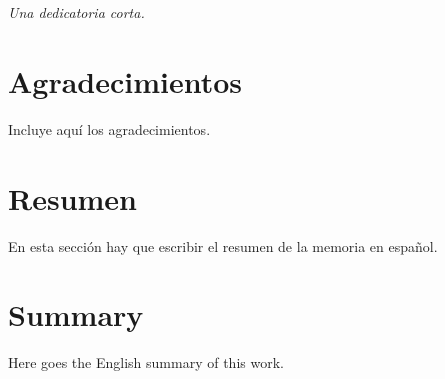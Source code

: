 \documentclass[$if(fontsize)$$fontsize$$else$11pt$endif$,$if(lang)$$babel-lang$,$endif$a4paper,$for(classoption)$$classoption$$sep$,$endfor$]{$documentclass$}
\begin{document}
\chapter*{}
\begin{flushright}
\textit{Una dedicatoria corta.}
\end{flushright}

\cleardoublepage


\chapter*{Agradecimientos}

Incluye aquí los agradecimientos.

\cleardoublepage


\chapter*{Resumen}

En esta sección hay que escribir el resumen de la memoria en español.




\chapter*{Summary}

Here goes the English summary of this work.




\end{document}
